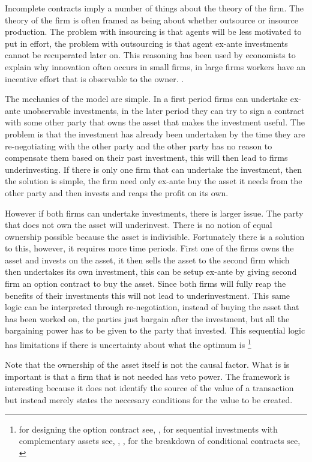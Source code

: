 \documentclass[12pt]{article}
\numberwithin{equation}{section}
\begin{document}
Incomplete contracts imply a number of things about the theory of the firm. The theory of the firm is often framed as being about whether outsource or insource production. The problem with insourcing is that agents will be less motivated to put in effort, the problem with outsourcing is that agent ex-ante investments cannot be recuperated later on. This reasoning has been used by economists to explain why innovation often occurs in small firms, in large firms workers have an incentive effort that is observable to the owner. \cite{Holmstrom1989}. 

The mechanics of the model are simple. In a first period firms can undertake ex-ante unobservable investments, in the later period they can try to sign a contract with some other party that owns the asset that makes the investment useful. The problem is that the investment has already been undertaken by the time they are re-negotiating with the other party and the other party has no reason to compensate them based on their past investment, this will then lead to firms underinvesting. If there is only one firm that can undertake the investment, then the solution is simple, the firm need only ex-ante buy the asset it needs from the other party and then invests and reaps the profit on its own. 

However if both firms can undertake investments, there is larger issue. The party that does not own the asset will underinvest. There is no notion of equal ownership possible because the asset is indivisible. Fortunately there is a solution to this, however, it requires more time periods. First one of the firms owns the asset and invests on the asset, it then sells the asset to the second firm which then undertakes its own investment, this can be setup ex-ante by giving second firm an option contract to buy the asset. Since both firms will fully reap the benefits of their investments this will not lead to underinvestment. This same logic can be interpreted through re-negotiation, instead of buying the asset that has been worked on, the parties just bargain after the investment, but all the bargaining power has to be given to the party that invested. This sequential logic has limitations if there is uncertainty about what the optimum is \footnote{for designing the option contract see, \cite{Noldeke1998}, for sequential investments with complementary assets see, \cite{Zhang2014},\cite{bessen_maskin} , for the breakdown of conditional contracts see, \cite{Maskin1999}} 

Note that the ownership of the asset itself is not the causal factor. What is is important is that a firm that is not needed has veto power. The framework is interesting because it does not identify the source of the value of a transaction but instead merely states the neccesary conditions for the value to be created. 
\end{document}
